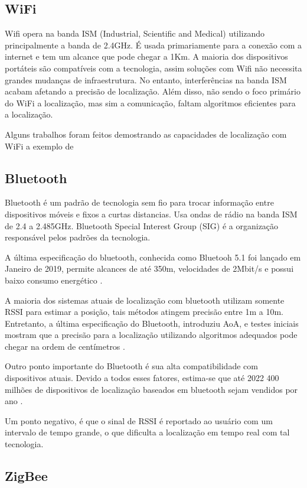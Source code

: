 \subsection{WiFi}
Wifi opera na banda ISM (Industrial, Scientific and Medical) utilizando principalmente a banda de 2.4GHz. É usada primariamente para a conexão com a internet e tem um alcance que pode chegar a 1Km. A maioria dos dispositivos portáteis são compatíveis com a tecnologia, assim soluções com Wifi não necessita grandes mudanças de infraestrutura. No entanto, interferências na banda ISM acabam afetando a precisão de localização. Além disso, não sendo o foco primário do WiFi a localização, mas sim a comunicação, faltam algoritmos eficientes para a localização.

Alguns trabalhos foram feitos demostrando as capacidades de localização com WiFi a exemplo de \cite{art7}

\subsection{Bluetooth}
Bluetooth é um padrão de tecnologia sem fio para trocar informação entre dispositivos móveis e fixos a curtas distancias. Usa ondas de rádio na banda ISM de 2.4 a 2.485GHz. Bluetooth Special Interest Group (SIG) é a organização responsável pelos padrões da tecnologia.

A última especificação do bluetooth, conhecida como Bluetooh 5.1 foi lançado em Janeiro de 2019, permite alcances de até 350m, velocidades de 2Mbit/s e possui baixo consumo energético \cite{art8}.

A maioria dos sistemas atuais de localização com bluetooth utilizam somente RSSI para estimar a posição, tais métodos atingem precisão entre 1m a 10m. Entretanto, a última especificação do Bluetooth, introduziu AoA, e testes iniciais mostram que a precisão para a localização utilizando algoritmos adequados pode chegar na ordem de centímetros \cite{art9}.

Outro ponto importante do Bluetooth é sua alta compatibilidade com dispositivos atuais. Devido a todos esses fatores, estima-se que até 2022 400 milhões de dispositivos de localização baseados em bluetooth sejam vendidos por ano \cite{art9}.

Um ponto negativo, é que o sinal de RSSI é reportado ao usuário com um intervalo de tempo grande, o que dificulta a localização em tempo real com tal tecnologia.

\subsection{ZigBee}

